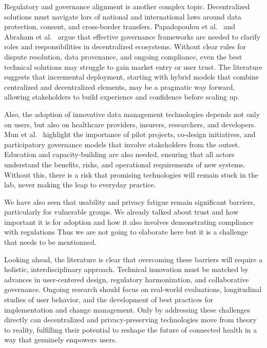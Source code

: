 	Regulatory and governance alignment is another complex topic. Decentralized solutions must navigate lors of national and international laws around data protection, consent, and cross-border transfers. Papadopoulou et al.~\cite{Papadopoulou2015} and Abraham et al.~\cite{Abraham2019} argue that effective governance frameworks are needed to clarify roles and responsibilities in decentralized ecosystems. Without clear rules for dispute resolution, data provenance, and ongoing compliance, even the best technical solutions may struggle to gain market entry or user trust. The literature suggests that incremental deployment, starting with hybrid models that combine centralized and decentralized elements, may be a pragmatic way forward, allowing stakeholders to build experience and confidence before scaling up.

	Also, the adoption of innovative data management technologies depends not only on users, but also on healthcare providers, insurers, researchers, and developers. Mun et al.~\cite{Mun2010} highlight the importance of pilot projects, co-design initiatives, and participatory governance models that involve stakeholders from the outset. Education and capacity-building are also needed, ensuring that all actors understand the benefits, risks, and operational requirements of new systems. Without this, there is a risk that promising technologies will remain stuck in the lab, never making the leap to everyday practice.

	We have also seen that usability and privacy fatigue remain significant barriers, particularly for vulnerable groups. We already talked about trust and how important it is for adoption and how it also involves demonstrating compliance with regulations
	Thus we are not going to elaborate here but it is a challenge that needs to be mentionned.

	Looking ahead, the literature is clear that overcoming these barriers will require a holistic, interdisciplinary approach. Technical innovation must be matched by advances in user-centered design, regulatory harmonization, and collaborative governance. Ongoing research should focus on real-world evaluations, longitudinal studies of user behavior, and the development of best practices for implementation and change management. Only by addressing these challenges directly can decentralized and privacy-preserving technologies move from theory to reality, fulfilling their potential to reshape the future of connected health in a way that genuinely empowers users.


